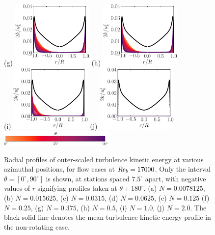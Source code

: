 \documentclass[lineno]{jfm}
\begin{document}
\begin{figure}
               (g) \includegraphics[width=4cm]{Figures/prof_tkeouter_rotz0_roty0.1875.eps}
               (h) \includegraphics[width=4cm]{Figures/prof_tkeouter_rotz0_roty0.25.eps} \\
               (i) \includegraphics[width=4cm]{Figures/prof_tkeouter_rotz0_roty0.5.eps}
               (j) \includegraphics[width=4cm]{Figures/prof_tkeouter_rotz0_roty1.0.eps} \\
               \includegraphics[width=0.5\textwidth]{Figures/theta_cmap_half.eps} \\
       \caption{
               Radial profiles of 
               outer-scaled turbulence kinetic energy
               at various azimuthal positions, 
               for flow cases at $\mbox{\textit{Re}}_b=17000$.
               Only the interval $\theta = [0^{\circ},90^{\circ}]$ is shown, at stations
               spaced $7.5^\circ$ apart, with negative values of $r$ signifying profiles
               taken at $\theta + 180^{\circ}$.
               (a) $N = 0.0078125$,
               (b) $N = 0.015625$,
               (c) $N = 0.0315$,
               (d) $N = 0.0625$,
               (e) $N = 0.125$
               (f) $N = 0.25$,
               (g) $N = 0.375$,
               (h) $N = 0.5$,
               (i) $N = 1.0$,
               (j) $N = 2.0$. 
               The black solid line denotes the mean turbulence kinetic energy profile in the
               non-rotating case.
               }
               \label{fig:tke}
       \end{figure}
       
\end{document}
